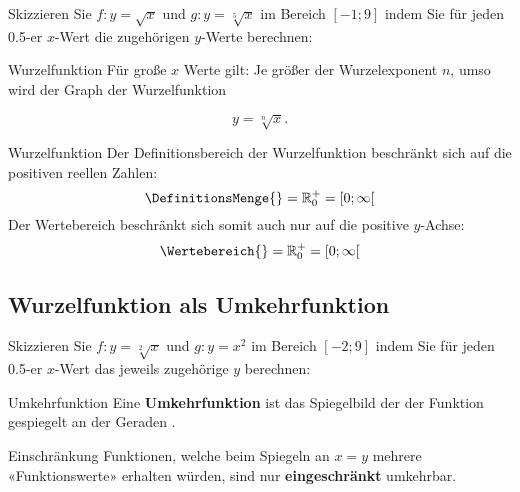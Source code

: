 Skizzieren Sie $f: y = \sqrt{x}$ und $g: y=\sqrt[5]{x}$ im Bereich $[-1; 9]$ indem Sie für jeden 0.5-er $x$-Wert die zugehörigen $y$-Werte berechnen:


\begin{bemerkung}{Wurzelfunktion}{}
Für große $x$ Werte gilt: Je größer der Wurzelexponent $n$, umso
 wird der Graph der Wurzelfunktion

$$y=\sqrt[n]{x}.$$ 

\end{bemerkung}


\begin{definition}{Wurzelfunktion}{}
  Der Definitionsbereich der Wurzelfunktion beschränkt sich auf die
  positiven reellen Zahlen:
  $$\DefinitionsMenge{} = \mathbb{R}_0^{+} = [0;\infty[$$
      Der Wertebereich beschränkt sich somit auch nur auf die positive $y$-Achse:
  $$\Wertebereich{} = \mathbb{R}_0^{+} = [0;\infty[$$
      
\end{definition}
\newpage

\subsection{Wurzelfunktion als Umkehrfunktion}

Skizzieren Sie $f: y = \sqrt[2]{x}$ und $g: y=x^2$ im Bereich $[-2; 9]$ indem Sie für jeden 0.5-er $x$-Wert das jeweils zugehörige $y$ berechnen:


\begin{bemerkung}{Umkehrfunktion}{}
  Eine \textbf{Umkehrfunktion} ist das Spiegelbild der der Funktion
  gespiegelt an der Geraden .
\end{bemerkung}  

\begin{bemerkung}{Einschränkung}{}
Funktionen, welche beim Spiegeln an $x=y$ mehrere «Funktionswerte»
erhalten würden, sind nur \textbf{eingeschränkt} umkehrbar.
\end{bemerkung}


